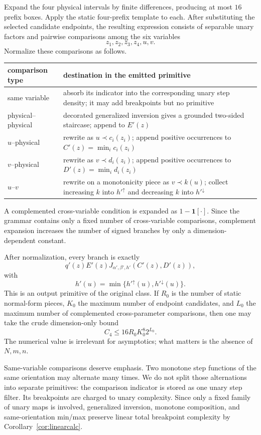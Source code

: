 \documentclass[12pt,a4paper]{article}
\theoremstyle{definition}
\newcommand{\1}{\mathbf 1}
\begin{document}
Expand the four physical intervals by finite differences, producing at most $16$ prefix boxes.  Apply the static four-prefix template to each.  After substituting the selected candidate endpoints, the resulting expression consists of separable unary factors and pairwise comparisons among the six variables
\[
z_1,z_2,z_3,z_4,u,v.
\]
Normalize these comparisons as follows.
\begin{center}
\begin{tabular}{p{}p{}}
\toprule
comparison type & destination in the emitted primitive \\
\midrule
same variable & absorb its indicator into the corresponding unary step density; it may add breakpoints but no primitive \\
physical--physical & decorated generalized inversion gives a grounded two-sided staircase; append to $E'(z)$ \\
$u$--physical & rewrite as $u\prec c_i(z_i)$; append positive occurrences to $C'(z)=\min_i c_i(z_i)$ \\
$v$--physical & rewrite as $v\prec d_i(z_i)$; append positive occurrences to $D'(z)=\min_i d_i(z_i)$ \\
$u$--$v$ & rewrite on a monotonicity piece as $v\prec k(u)$; collect increasing $k$ into $h'^{\uparrow}$ and decreasing $k$ into $h'^{\downarrow}$ \\
\bottomrule
\end{tabular}
\end{center}
A complemented cross-variable condition is expanded as $1-\1[\cdot]$.  Since the grammar contains only a fixed number of cross-variable comparisons, complement expansion increases the number of signed branches by only a dimension-dependent constant.

After normalization, every branch is exactly
\[
q'(z)E'(z)
J_{\alpha',\beta',h'}(C'(z),D'(z)),
\]
with
\[
h'(u)=\min\{h'^{\uparrow}(u),h'^{\downarrow}(u)\}.
\]
This is an output primitive of the original class.  If $R_0$ is the number of static normal-form pieces, $K_0$ the maximum number of endpoint candidates, and $L_0$ the maximum number of complemented cross-parameter comparisons, then one may take the crude dimension-only bound
\[
C_4\le 16R_0K_0^8 2^{L_0}.
\]
The numerical value is irrelevant for asymptotics; what matters is the absence of $N,m,n$.

Same-variable comparisons deserve emphasis.  Two monotone step functions of the same orientation may alternate many times.  We do not split those alternations into separate primitives: the comparison indicator is stored as one unary step filter.  Its breakpoints are charged to unary complexity.  Since only a fixed family of unary maps is involved, generalized inversion, monotone composition, and same-orientation min/max preserve linear total breakpoint complexity by Corollary~\ref{cor:linearcalc}.
\end{document}
